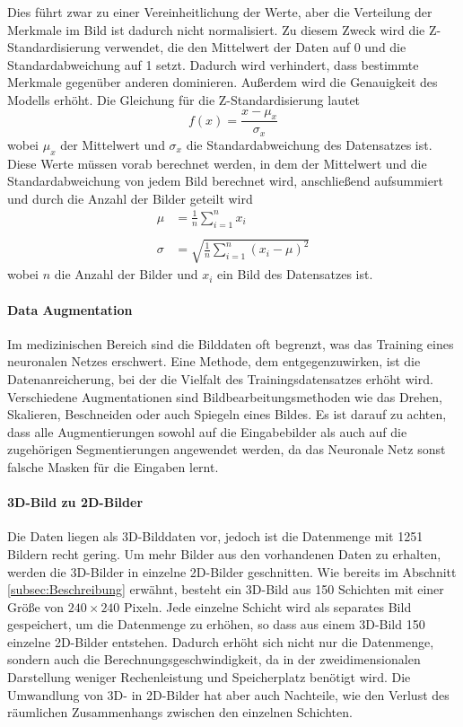 Dies führt zwar zu einer Vereinheitlichung der Werte, aber die Verteilung der Merkmale im Bild ist dadurch nicht normalisiert. Zu diesem Zweck wird die Z-Standardisierung verwendet, die den Mittelwert der Daten auf 0 und die Standardabweichung auf 1 setzt. Dadurch wird verhindert, dass bestimmte Merkmale gegenüber anderen dominieren. Außerdem wird die Genauigkeit des \glspl{Modell} erhöht.\cite[vgl.][]{Goodfellow2016} Die Gleichung für die Z-Standardisierung lautet
\begin{equation}
	f(x)=\frac{x - \mu_x}{\sigma_x}
\end{equation}
wobei $\mu_x$ der Mittelwert und $\sigma_x$ die Standardabweichung des Datensatzes ist. Diese Werte müssen vorab berechnet werden, in dem der Mittelwert und die Standardabweichung von jedem Bild berechnet wird, anschließend aufsummiert und durch die Anzahl der Bilder geteilt wird
\begin{equation}
	\begin{aligned}
		\mu &= \frac{1}{n}\sum_{i=1}^{n}x_i \\ \\
		\sigma &= \sqrt{\frac{1}{n}\sum_{i=1}^{n}(x_i - \mu)^2}
	\end{aligned}
\end{equation}
wobei $n$ die Anzahl der Bilder und $x_i$ ein Bild des Datensatzes ist.

\paragraph{Data Augmentation} 
Im medizinischen Bereich sind die Bilddaten oft begrenzt, was das Training eines neuronalen Netzes erschwert. Eine Methode, dem entgegenzuwirken, ist die Datenanreicherung, bei der die Vielfalt des Trainingsdatensatzes erhöht wird. Verschiedene Augmentationen sind Bildbearbeitungsmethoden wie das Drehen, Skalieren, Beschneiden oder auch Spiegeln eines Bildes. Es ist darauf zu achten, dass alle Augmentierungen sowohl auf die Eingabebilder als auch auf die zugehörigen Segmentierungen angewendet werden, da das Neuronale Netz sonst falsche Masken für die Eingaben lernt. \cite[vgl.][]{Shorten2019}

\paragraph{3D-Bild zu 2D-Bilder} 
Die Daten liegen als 3D-Bilddaten vor, jedoch ist die Datenmenge mit 1251 Bildern recht gering. Um mehr Bilder aus den vorhandenen Daten zu erhalten, werden die 3D-Bilder in einzelne 2D-Bilder geschnitten. Wie bereits im Abschnitt \ref{subsec:Beschreibung} erwähnt, besteht ein 3D-Bild aus 150 Schichten mit einer Größe von $240\times240$ Pixeln. Jede einzelne Schicht wird als separates Bild gespeichert, um die Datenmenge zu erhöhen, so dass aus einem 3D-Bild 150 einzelne 2D-Bilder entstehen. Dadurch erhöht sich nicht nur die Datenmenge, sondern auch die Berechnungsgeschwindigkeit, da in der zweidimensionalen Darstellung weniger Rechenleistung und Speicherplatz benötigt wird. Die Umwandlung von 3D- in 2D-Bilder hat aber auch Nachteile, wie den Verlust des räumlichen Zusammenhangs zwischen den einzelnen Schichten. \cite[vgl.][]{Stevens2020}

